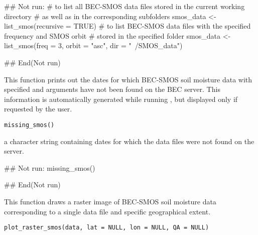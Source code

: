 \documentclass[a4paper]{book}
\begin{document}
%
\begin{Examples}
\begin{ExampleCode}
## Not run: 
# to list all BEC-SMOS data files stored in the current working directory
# as well as in the corresponding subfolders
smos_data <- list_smos(recursive = TRUE)
# to list BEC-SMOS data files with the specified frequency and SMOS orbit
# stored in the specified folder
smos_data <- list_smos(freq = 3, orbit = "asc", dir = "~/SMOS_data")

## End(Not run)

\end{ExampleCode}
\end{Examples}
%
\begin{Description}
This function prints out the dates for which BEC-SMOS soil moisture data with
specified  and  arguments have not been found on
the BEC server. This information is automatically generated while running
, but displayed only if requested by the
user.
\end{Description}
%
\begin{Usage}
\begin{verbatim}
missing_smos()
\end{verbatim}
\end{Usage}
%
\begin{Value}
a character string containing dates for which the data files were not
found on the server.
\end{Value}
%
\begin{Examples}
\begin{ExampleCode}
## Not run: 
missing_smos()

## End(Not run)

\end{ExampleCode}
\end{Examples}
%
\begin{Description}
This function draws a raster image of BEC-SMOS soil moisture data
corresponding to a single data file and specific geographical extent.
\end{Description}
%
\begin{Usage}
\begin{verbatim}
plot_raster_smos(data, lat = NULL, lon = NULL, QA = NULL)
\end{verbatim}
\end{Usage}
\end{document}
